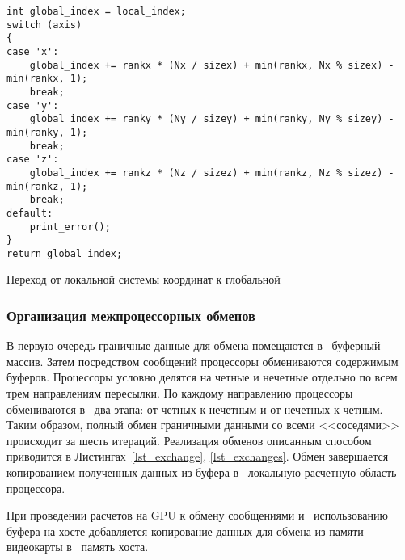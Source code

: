 \begin{listing}[!h]
\begin{verbatim}
int global_index = local_index;
switch (axis)
{
case 'x':
    global_index += rankx * (Nx / sizex) + min(rankx, Nx % sizex) - min(rankx, 1);
    break;
case 'y':
    global_index += ranky * (Ny / sizey) + min(ranky, Ny % sizey) - min(ranky, 1);
    break;
case 'z':
    global_index += rankz * (Nz / sizez) + min(rankz, Nz % sizez) - min(rankz, 1);
    break;
default:
    print_error();
}
return global_index;
\end{verbatim}
\caption{Переход от локальной системы координат к глобальной}
\label{lst_localglobal}
\end{listing}

\subsubsection{Организация межпроцессорных обменов}

В первую очередь граничные данные для обмена помещаются в~
буферный массив. Затем посредством сообщений процессоры
обмениваются содержимым буферов. Процессоры условно делятся
на четные и нечетные отдельно по всем трем направлениям пересылки.
По каждому направлению процессоры обмениваются в~ два этапа:
от четных к нечетным и от нечетных к четным. Таким образом,
полный обмен граничными данными со всеми <<соседями>> происходит
за шесть итераций. Реализация обменов описанным способом 
приводится в Листингах~\ref{lst_exchange}, \ref{lst_exchanges}. 
Обмен завершается копированием
полученных данных из буфера в~ локальную расчетную область процессора.

При проведении расчетов на GPU к обмену сообщениями и~ использованию
буфера на хосте
добавляется копирование данных для обмена из памяти видеокарты
в~ память хоста.

